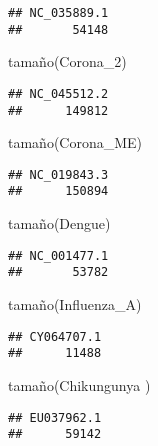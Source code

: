 \documentclass[
]{article}
\newenvironment{Shaded}{\begin{snugshade}}{\end{snugshade}}
\newcommand{\NormalTok}[1]{#1}
\begin{document}
\begin{verbatim}
## NC_035889.1 
##       54148
\end{verbatim}

\begin{Shaded}
\begin{Highlighting}[]
\NormalTok{tamaño(Corona\_2)}
\end{Highlighting}
\end{Shaded}

\begin{verbatim}
## NC_045512.2 
##      149812
\end{verbatim}

\begin{Shaded}
\begin{Highlighting}[]
\NormalTok{tamaño(Corona\_ME)}
\end{Highlighting}
\end{Shaded}

\begin{verbatim}
## NC_019843.3 
##      150894
\end{verbatim}

\begin{Shaded}
\begin{Highlighting}[]
\NormalTok{tamaño(Dengue)}
\end{Highlighting}
\end{Shaded}

\begin{verbatim}
## NC_001477.1 
##       53782
\end{verbatim}

\begin{Shaded}
\begin{Highlighting}[]
\NormalTok{tamaño(Influenza\_A)}
\end{Highlighting}
\end{Shaded}

\begin{verbatim}
## CY064707.1 
##      11488
\end{verbatim}

\begin{Shaded}
\begin{Highlighting}[]
\NormalTok{tamaño(Chikungunya )}
\end{Highlighting}
\end{Shaded}

\begin{verbatim}
## EU037962.1 
##      59142
\end{verbatim}
\end{document}

